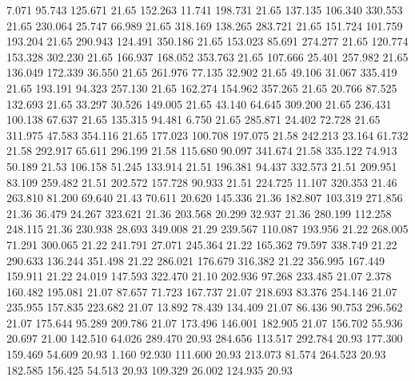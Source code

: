    7.071   95.743  125.671        21.65
 152.263   11.741  198.731        21.65
 137.135  106.340  330.553        21.65
 230.064   25.747   66.989        21.65
 318.169  138.265  283.721        21.65
 151.724  101.759  193.204        21.65
 290.943  124.491  350.186        21.65
 153.023   85.691  274.277        21.65
 120.774  153.328  302.230        21.65
 166.937  168.052  353.763        21.65
 107.666   25.401  257.982        21.65
 136.049  172.339   36.550        21.65
 261.976   77.135   32.902        21.65
  49.106   31.067  335.419        21.65
 193.191   94.323  257.130        21.65
 162.274  154.962  357.265        21.65
  20.766   87.525  132.693        21.65
  33.297   30.526  149.005        21.65
  43.140   64.645  309.200        21.65
 236.431  100.138   67.637        21.65
 135.315   94.481    6.750        21.65
 285.871   24.402   72.728        21.65
 311.975   47.583  354.116        21.65
 177.023  100.708  197.075        21.58
 242.213   23.164   61.732        21.58
 292.917   65.611  296.199        21.58
 115.680   90.097  341.674        21.58
 335.122   74.913   50.189        21.53
 106.158   51.245  133.914        21.51
 196.381   94.437  332.573        21.51
 209.951   83.109  259.482        21.51
 202.572  157.728   90.933        21.51
 224.725   11.107  320.353        21.46
 263.810   81.200   69.640        21.43
  70.611   20.620  145.336        21.36
 182.807  103.319  271.856        21.36
  36.479   24.267  323.621        21.36
 203.568   20.299   32.937        21.36
 280.199  112.258  248.115        21.36
 230.938   28.693  349.008        21.29
 239.567  110.087  193.956        21.22
 268.005   71.291  300.065        21.22
 241.791   27.071  245.364        21.22
 165.362   79.597  338.749        21.22
 290.633  136.244  351.498        21.22
 286.021  176.679  316.382        21.22
 356.995  167.449  159.911        21.22
  24.019  147.593  322.470        21.10
 202.936   97.268  233.485        21.07
   2.378  160.482  195.081        21.07
  87.657   71.723  167.737        21.07
 218.693   83.376  254.146        21.07
 235.955  157.835  223.682        21.07
  13.892   78.439  134.409        21.07
  86.436   90.753  296.562        21.07
 175.644   95.289  209.786        21.07
 173.496  146.001  182.905        21.07
 156.702   55.936   20.697        21.00
 142.510   64.026  289.470        20.93
 284.656  113.517  292.784        20.93
 177.300  159.469   54.609        20.93
   1.160   92.930  111.600        20.93
 213.073   81.574  264.523        20.93
 182.585  156.425   54.513        20.93
 109.329   26.002  124.935        20.93
